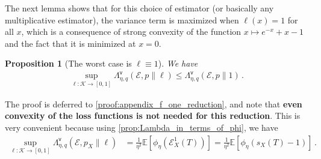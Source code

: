 \documentclass{article}
\theoremstyle{plain}
\newtheorem{proposition}[theorem]{Proposition}
\theoremstyle{definition}
\theoremstyle{plain}
\newcommand{\E}{\mathbb E}
\newcommand{\K}{\mathcal K}
\newcommand{\cE}{\mathcal E}
\begin{document}
The next lemma shows that for this choice of estimator (or basically any multiplicative estimator), the variance term is maximized when $\ell(x) = 1$ for all $x$, which is a consequence of strong convexity of the function $x \mapsto e^{-x} + x - 1$ and the fact that it is minimized at $x=0$.
\begin{proposition}[The worst case is $\ell \equiv 1$]
    \label{lem:appendix_f_one_reduction}
    We have
    \begin{align}
        \sup_{\ell: \K \to [0,1]}
        \Lambda^{\mathsf{v}}_{\eta, q}(\cE, p \| \ell)
        \leq
        \Lambda^{\mathsf{v}}_{\eta, q}(\cE, p \| 1)\,.
    \end{align}
\end{proposition}
The proof is deferred to \cref{proof:appendix_f_one_reduction}, and note that \textbf{even convexity of the loss functions is not needed for this reduction}.
This is very convenient because using \cref{prop:Lambda_in_terms_of_phi}, we have
\begin{align}
    \sup_{\ell: \K \to [0,1]}
    \Lambda^{\mathsf{v}}_{\eta, q}(\cE, p_X\| \ell)
     & =
    \frac{1}{\eta^2}
    \E\left[
        \phi_\eta(\cE_X^1(T))
        \right]
    =
    \frac{1}{\eta^2}
    \E\left[
        \phi_\eta(s_X(T) - 1)
        \right]
    \,. \label{eq:variance_reduction_to_f_one}
\end{align}
\end{document}
